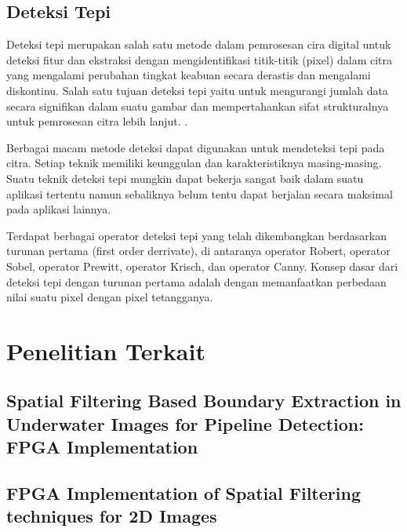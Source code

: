 


\subsection{Deteksi Tepi}
Deteksi tepi merupakan salah satu metode dalam pemrosesan cira digital untuk deteksi fitur dan ekstraksi dengan mengidentifikasi titik-titik (pixel) dalam citra yang mengalami perubahan tingkat keabuan secara derastis dan mengalami diskontinu. Salah satu tujuan deteksi tepi yaitu untuk mengurangi jumlah data secara signifikan dalam suatu gambar dan mempertahankan sifat strukturalnya untuk pemrosesan citra lebih lanjut. .

Berbagai macam metode deteksi dapat digunakan untuk mendeteksi tepi pada citra. Setiap teknik memiliki keunggulan dan karakteristiknya masing-masing. Suatu teknik deteksi tepi mungkin dapat bekerja sangat baik dalam suatu aplikasi tertentu namun sebaliknya belum tentu dapat berjalan secara maksimal pada aplikasi lainnya.

Terdapat berbagai operator deteksi tepi yang telah dikembangkan berdasarkan turunan pertama (first order derrivate), di antaranya operator Robert, operator Sobel, operator Prewitt, operator Krisch, dan operator Canny. Konsep dasar dari deteksi tepi dengan turunan pertama adalah dengan memanfaatkan perbedaan nilai suatu pixel dengan pixel tetangganya. 


\section{Penelitian Terkait}
\subsection{Spatial Filtering Based Boundary Extraction in Underwater Images for Pipeline Detection: FPGA Implementation}
\blindtext {}

\subsection{FPGA Implementation of Spatial Filtering techniques for 2D Images}
\blindtext {}

